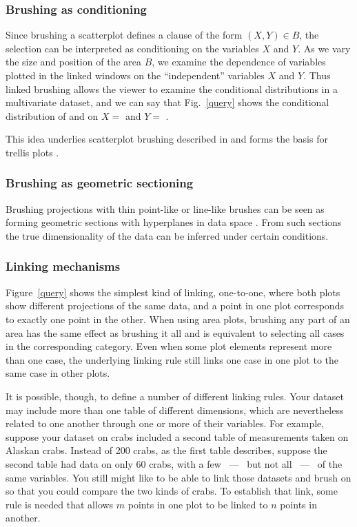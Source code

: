 \subsubsection{Brushing as conditioning}

Since brushing  a scatterplot defines a clause of the
form $(X,Y) \in B$, the selection can be interpreted as conditioning
on the variables $X$ and $Y$.  As we vary the size and position of the
area $B$, we examine the dependence of variables plotted in the linked
windows on the ``independent'' variables $X$ and $Y$. Thus linked
brushing allows the viewer to examine the conditional distributions in
a multivariate dataset, and we can say that Fig.~\ref{query} shows
the conditional distribution of  and  on $X =$
 and $Y = $ .

This idea underlies scatterplot brushing described in
 and forms the basis for trellis plots 
\cite{BeCS96}.

\subsubsection{Brushing as geometric sectioning} 

Brushing projections  with thin point-like or
line-like brushes can be seen as forming geometric sections with
hyperplanes in data space \cite{FB94}.  From such sections the true
dimensionality of the data can be inferred under certain conditions.

\subsubsection{Linking mechanisms}


Figure~\ref{query} shows the simplest kind of linking, one-to-one,
where both plots show different projections of the same data, and a
point in one plot corresponds to exactly one point in the other.  When
using area plots, brushing any part of an area has the same effect as
brushing it all and is equivalent to selecting all cases in the
corresponding category.  Even when some plot elements represent more
than one case, the underlying linking rule still links one case in one
plot to the same case in other plots.  

It is possible, though, to define a number of different linking rules.
Your dataset may include more than one table of different
dimensions, which are nevertheless related to one another through one
or more of their variables.  For example, suppose your dataset on
crabs included a second table of measurements taken on Alaskan crabs.
Instead of 200 crabs, as the first table describes, suppose the second
table had data on only 60 crabs, with a few ~---~ but not all ~---~ of
the same variables.  You still might like to be able to link those
datasets and brush on  so that you could compare the two
kinds of crabs.  To establish that link, some rule is needed that
allows $m$ points in one plot to be linked to $n$ points in another.

